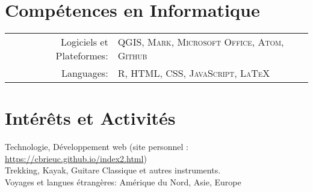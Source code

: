 \documentclass[a4paper,10pt]{article}
\begin{document}
\section{Compétences en Informatique}
\begin{tabular}{rl}
Logiciels et Plateformes:& \textsc{QGIS}, \textsc{Mark}, \textsc{Microsoft Office}, \textsc{Atom}, \textsc{Github}\\
Languages:& \textsc{R}, \textsc{HTML}, \textsc{CSS}, \textsc{JavaScript}, \textsc{LaTeX}\\
\end{tabular}

\section{Intérêts et Activités}
Technologie, Développement web (site personnel : \href{https://cbrieuc.github.io/index2.html}{https://cbrieuc.github.io/index2.html})\\
Trekking, Kayak, Guitare Classique et autres instruments.\\
Voyages et langues étrangères: Amérique du Nord, Asie, Europe


\end{document}
